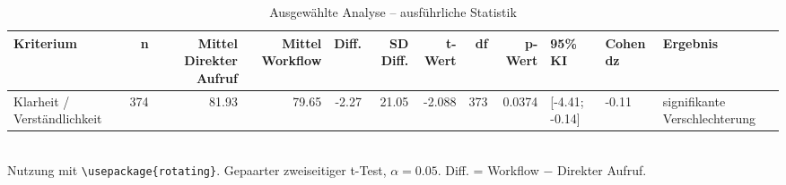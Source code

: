 \begin{table}
\centering
\caption{Ausgewählte Analyse -- ausführliche Statistik}
\begin{tabular}{lrrrrrrrrlll}
\toprule
Kriterium & n & Mittel Direkter Aufruf & Mittel Workflow & Diff. & SD Diff. & t-Wert & df & p-Wert & 95\% KI & Cohen dz & Ergebnis \\
\midrule
Klarheit / Verständlichkeit & 374 & 81.93 & 79.65 & -2.27 & 21.05 & -2.088 & 373 & 0.0374 & [-4.41; -0.14] & -0.11 & signifikante Verschlechterung \\
\bottomrule
\end{tabular}
\\[2mm]
\footnotesize Nutzung mit \texttt{\textbackslash usepackage\{rotating\}}. Gepaarter zweiseitiger t-Test, $\alpha=0.05$. Diff. = Workflow $-$ Direkter Aufruf.
\end{table}

